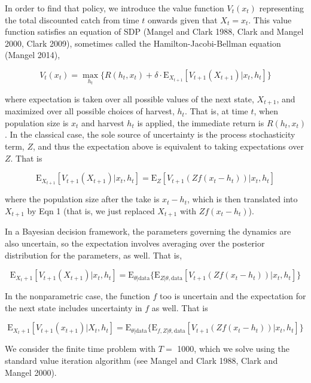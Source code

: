 \documentclass[author-year, 12pt,review]{components/elsarticle} %
\begin{document}
In order to find that policy, we introduce the value function $V_t(x_t)$
representing the total discounted catch from time $t$ onwards given that
$X_t=x_t$. This value function satisfies an equation of SDP (Mangel and
Clark 1988, Clark and Mangel 2000, Clark 2009), sometimes called the
Hamilton-Jacobi-Bellman equation (Mangel 2014),

\begin{equation}
V_t(x_t) = \max_{h_t} \lbrace R(h_t, x_t) + \delta \cdot \mathbf{\mathrm{E}}_{X_{t+1}} \left[ V_{t+1}( X_{t+1}) | x_t, h_t \right] \rbrace
\end{equation}

where expectation is taken over all possible values of the next state,
$X_{t+1}$, and maximized over all possible choices of harvest, $h_t$.
That is, at time $t$, when population size is $x_t$ and harvest $h_t$ is
applied, the immediate return is $R(h_t, x_t)$. In the classical case,
the sole source of uncertainty is the process stochasticity term, $Z$,
and thus the expectation above is equivalent to taking expectations over
$Z$. That is

\[ \mathbf{\mathrm{E}}_{X_{t+1}} \left[ V_{t+1}( X_{t+1}) | x_t, h_t \right] = \mathbf{\mathrm{E}}_{Z} \left[ V_{t+1}( Z f(x_t - h_t))  | x_t, h_t \right] \]

where the population size after the take is $x_t-h_t$, which is then
translated into $X_{t+1}$ by Eqn 1 (that is, we just replaced $X_{t+1}$
with $Z f(x_t-h_t)$).

In a Bayesian decision framework, the parameters governing the dynamics
are also uncertain, so the expectation involves averaging over the
posterior distribution for the parameters, as well. That is,

\[\mathbf{\mathrm{E}}_{X_t+1} \left[ V_{t+1}( X_{t+1}) | x_t, h_t \right] = \mathbf{\mathrm{E}}_{\theta|\mathrm{data}} \{ \mathbf{\mathrm{E}}_{Z | \theta, \mathrm{data}} \left[ V_{t+1}( Z f(x_t - h_t))  | x_t, h_t \right] \}\]

In the nonparametric case, the function $f$ too is uncertain and the
expectation for the next state includes uncertainty in $f$ as well. That
is

\[\mathbf{\mathrm{E}}_{X_t+1} \left[ V_{t+1}( x_{t+1}) | X_t, h_t \right] = \mathbf{\mathrm{E}}_{\theta|\mathrm{data}} \{ \mathbf{\mathrm{E}}_{f, Z | \theta, \mathrm{data}} \left[ V_{t+1}( Z f(x_t - h_t))  | x_t, h_t \right] \}\]

We consider the finite time problem with $T=$ 1000, which we solve using
the standard value iteration algorithm (see Mangel and Clark 1988, Clark
and Mangel 2000).
\end{document}
